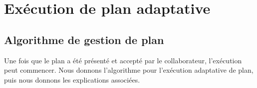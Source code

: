 \documentclass[a4paper,11pt,twoside]{StyleThese}
\begin{document}

\section{Exécution de plan adaptative}
\label{planExecution}

\subsection{Algorithme de gestion de plan}
\label{sec:algo}
Une fois que le plan a été présenté et accepté par le collaborateur, l'exécution peut commencer. Nous donnons l'algorithme pour l'exécution adaptative de plan, puis nous donnons les explications associées.



        
         
             
\end{document}
